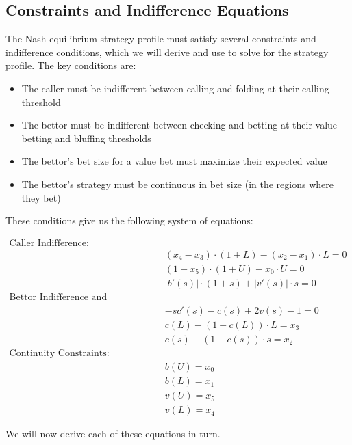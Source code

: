 \documentclass[../../main/main.tex]{subfiles}
\begin{document}


\subsection{Constraints and Indifference Equations}

The Nash equilibrium strategy profile must satisfy several constraints and indifference conditions, which we will derive and use to solve for the strategy profile. The key conditions are:

\begin{itemize}
    \item The caller must be indifferent between calling and folding at their calling threshold
    \item The bettor must be indifferent between checking and betting at their value betting and bluffing thresholds
    \item The bettor's bet size for a value bet must maximize their expected value
    \item The bettor's strategy must be continuous in bet size (in the regions where they bet)
\end{itemize}

These conditions give us the following system of equations:

\begin{align*}
    \text{Caller Indifference:} & \\
    & (x_4-x_3) \cdot (1+L) - (x_2-x_1) \cdot L = 0\\
    & (1-x_5) \cdot (1+U) - x_0 \cdot U = 0\\
    & |b'(s)| \cdot (1 + s) + |v'(s)| \cdot s = 0\\
    \text{Bettor Indifference and Optimality:} & \\
    & -sc'(s) - c(s) + 2 v(s) - 1 = 0\\
    & c(L) - (1-c(L)) \cdot L = x_3\\
    & c(s) - (1-c(s)) \cdot s = x_2\\
    \text{Continuity Constraints:} & \\
    & b(U) = x_0 \\
    & b(L) = x_1 \\
    & v(U) = x_5 \\
    & v(L) = x_4
\end{align*}

We will now derive each of these equations in turn.
\end{document}
